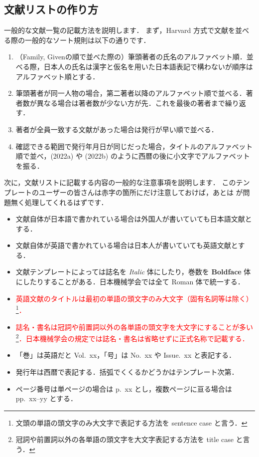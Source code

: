\subsection{文献リストの作り方}
\label{ssec:bib_list}

一般的な文献一覧の記載方法を説明します．
まず，Harvard 方式で文献を並べる際の一般的なソート規則は以下の通りです．
\begin{tcolorbox}[title={文献ソート規則}]
    \begin{enumerate}
        \item （Family, Givenの順で並べた際の）筆頭著者の氏名のアルファベット順．並べる際，日本人の氏名は漢字と仮名を用いた日本語表記で構わないが順序はアルファベット順とする．
        \item 筆頭著者が同一人物の場合，第二著者以降のアルファベット順で並べる．著者数が異なる場合は著者数が少ない方が先．これを最後の著者まで繰り返す．
        \item 著者が全員一致する文献があった場合は発行が早い順で並べる．
        \item 確認できる範囲で発行年月日が同じだった場合，タイトルのアルファベット順で並べ，(2022a) や (2022b) のように西暦の後に小文字でアルファベットを振る．
    \end{enumerate}
\end{tcolorbox}
次に，文献リストに記載する内容の一般的な注意事項を説明します．
このテンプレートのユーザーの皆さんは赤字の箇所にだけ注意しておけば，あとは \BibTeX が問題無く処理してくれるはずです．
\begin{tcolorbox}[title={文献リスト作成の注意事項}]
    \begin{itemize}
        \item 文献自体が日本語で書かれている場合は外国人が書いていても日本語文献とする．
        \item 文献自体が英語で書かれている場合は日本人が書いていても英語文献とする．
        \item 文献テンプレートによっては誌名を \textit{Italic} 体にしたり，巻数を \textbf{Boldface} 体にしたりすることがある．日本機械学会では全て Roman 体で統一する．
        \item \textcolor{red}{英語文献のタイトルは最初の単語の頭文字のみ大文字（固有名詞等は除く）\footnote{文頭の単語の頭文字のみ大文字で表記する方法を sentence case と言う．}．}
        \item \textcolor{red}{誌名・書名は冠詞や前置詞以外の各単語の頭文字を大文字にすることが多い\footnote{冠詞や前置詞以外の各単語の頭文字を大文字表記する方法を title case と言う．}．日本機械学会の規定では誌名・書名は省略せずに正式名称で記載する．}
        \item 「巻」は英語だと Vol.~xx，「号」は No.~xx や Issue.~xx と表記する．
        \item 発行年は西暦で表記する．括弧でくくるかどうかはテンプレート次第．
        \item ページ番号は単ページの場合は p.~xx とし，複数ページに亘る場合は pp.~xx--yy とする．
    \end{itemize}
\end{tcolorbox}


